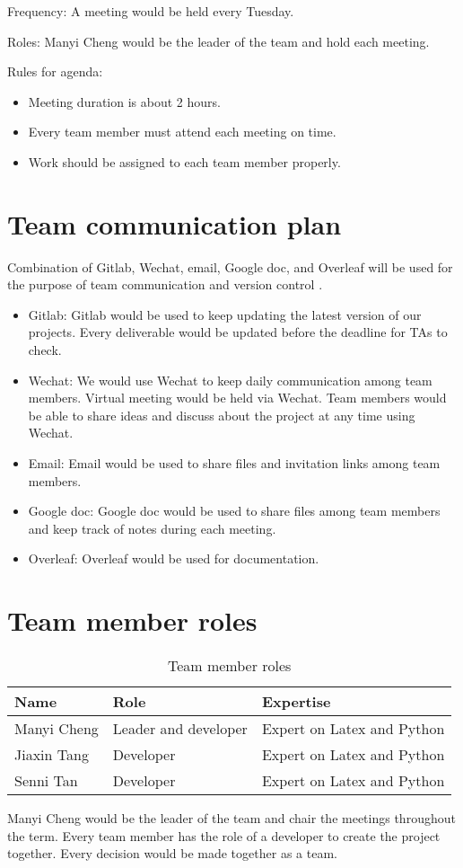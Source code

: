 \documentclass{article}
\begin{document}
Frequency: A meeting would be held every Tuesday.

Roles: Manyi Cheng would be the leader of the team and hold each meeting.

Rules for agenda:
\begin{itemize}
    \item Meeting duration is about 2 hours.
    \item Every team member must attend each meeting on time.
    \item Work should be assigned to each team member properly.
\end{itemize}

\section{Team communication plan}
Combination of Gitlab, Wechat, email, Google doc, and Overleaf will be used for the purpose of team communication and version control .
\begin{itemize}
    \item Gitlab: Gitlab would be used to keep updating the latest version of our projects. Every deliverable would be updated before the deadline for TAs to check.
    \item Wechat: We would use Wechat to keep daily communication among team members. Virtual meeting would be held via Wechat. Team members would be able to share ideas and discuss about the project at any time using Wechat.
    \item Email: Email would be used to share files and invitation links among team members.
    \item Google doc: Google doc would be used to share files among team members and keep track of notes during each meeting.
    \item Overleaf: Overleaf would be used for documentation.
\end{itemize}

\section{Team member roles}
\begin{table}[h!]
    \begin{center}
    \begin{tabularx}{\textwidth}{|X|X|X|}
        \hline
         Name & Role & Expertise\\
        \hline
        Manyi Cheng & Leader and developer & Expert on Latex and Python\\
        \hline
        Jiaxin Tang & Developer & Expert on Latex and Python\\
        \hline
        Senni Tan & Developer & Expert on Latex and Python\\
        \hline
    \end{tabularx}
    \caption{Team member roles}
    \label{tab:roles}
    \end{center}
\end{table}
Manyi Cheng would be the leader of the team and chair the meetings throughout the term. Every team member has the role of a developer to create the project together. Every decision would be made together as a team.
\end{document}
